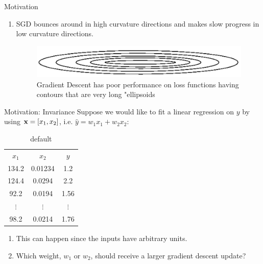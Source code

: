 \documentclass[xcolor=pdftex,dvipsnames,table,mathserif]{beamer}
\begin{document}
\begin{frame}{Motivation}
\begin{enumerate}
\item SGD bounces around in high curvature directions and makes slow progress in low curvature directions. 
\begin{figure}
\includegraphics[width=.75\columnwidth]{../graphics/EllipsesValues}
\caption{Gradient Descent has poor performance on loss functions having contours that are very long "ellipsoids}
\end{figure}
\end{enumerate}
\end{frame}


\begin{frame}{Motivation: Invariance}
Suppose we would like to fit a linear regression on $y$ by using $\mathbf{x}=[x_1,x_2]$, i.e. $\hat{y}=w_1x_1+w_2x_2$:
\begin{table}[htdp]
\caption{default}
\begin{center}
\begin{tabular}{|c|c|c|}
$x_1$ & $x_2$ & $y$ \\
134.2 & 0.01234 & 1.2 \\
124.4 & 0.0294 & 2.2 \\
92.2& 0.0194 & 1.56 \\
$\vdots$ & $\vdots$ &$\vdots$ \\
98.2& 0.0214 & 1.76 \\
\end{tabular}
\end{center}
\label{default}
\end{table}%
\begin{enumerate}
\item This can happen since the inputs have arbitrary units.
\item Which weight, $w_1$ or $w_2$, should receive a larger gradient descent update?
\end{enumerate}
\end{frame}
\end{document}
